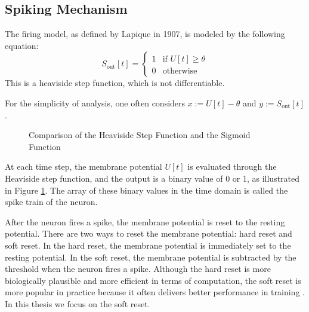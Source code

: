     \subsection{Spiking Mechanism}
    \label{subsec:lif_spiking}
        The firing model, as defined by Lapique in 1907, is modeled by the following equation:
        \begin{equation}
            S_{\text{out}}[t] = \begin{cases}
                1 & \text{if } U[t] \geq \theta \\
                0 & \text{otherwise}
            \end{cases}
        \end{equation}
        This is a heaviside step function, which is not differentiable. 

        For the simplicity of analysis, one often considers $x := U[t] - \theta$ and $y := S_{\text{out}}[t]$.
        \begin{figure}[!htpb]
            \centering
            \caption{Comparison of the Heaviside Step Function and the Sigmoid Function}
            \label{fig:heaviside_sigmoid}
        \end{figure}
        At each time step, the membrane potential $U[t]$ is evaluated through the Heaviside step function, and the output is a binary value of 0 or 1, as illustrated in Figure \ref{fig:heaviside_sigmoid}. The array of these binary values in the time domain is called the spike train of the neuron. 

        After the neuron fires a spike, the membrane potential is reset to the resting potential. There are two ways to reset the membrane potential: hard reset and soft reset. In the hard reset, the membrane potential is immediately set to the resting potential. In the soft reset, the membrane potential is subtracted by the threshold when the neuron fires a spike. Although the hard reset is more biologically plausible and more efficient in terms of computation, the soft reset is more popular in practice because it often delivers better performance in training \cite{10242251}. In this thesis we focus on the soft reset.

